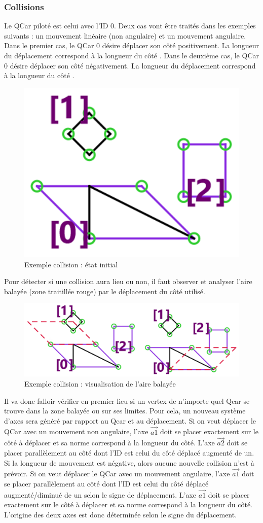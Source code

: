 \documentclass[a4paper, 12pt]{article}
\begin{document}
\subsubsection{Collisions}
Le QCar piloté est celui avec l'ID 0. Deux cas vont être traités dans les exemples suivants : un mouvement linéaire (non angulaire) et un mouvement angulaire. Dans le premier cas, le QCar 0 désire déplacer son côté  positivement. La longueur du déplacement correspond à la longueur du côté . Dans le deuxième cas, le QCar 0 désire déplacer son côté  négativement. La longueur du déplacement correspond à la longueur du côté .
\begin{figure}[h!]
\centering
\includegraphics[width=0.4\linewidth]{includes/images/collisions/1_initialState}
\caption{Exemple collision : état initial}
\label{fig:1initialstate}
\end{figure}
Pour détecter si une collision aura lieu ou non, il faut observer et analyser l'aire balayée (zone traitillée rouge) par le déplacement du côté utilisé.
\begin{figure}[h!]
\centering
\includegraphics[width=0.7\linewidth]{includes/images/collisions/2_sweptArea}
\caption{Exemple collision : visualisation de l'aire balayée}
\label{fig:2sweptarea}
\end{figure}
Il va donc falloir vérifier en premier lieu si un vertex de n'importe quel Qcar se trouve dans la zone balayée ou sur ses limites. Pour cela, un nouveau système d'axes sera généré par rapport au Qcar et au déplacement. Si on veut déplacer le QCar avec un mouvement non angulaire, l'axe $\vec{a1}$ doit se placer exactement sur le côté à déplacer et sa norme correspond à la longueur du côté. L'axe $\vec{a2}$ doit se placer parallèlement au côté dont l'ID est celui du côté déplacé augmenté de un. Si la longueur de mouvement est négative, alors aucune nouvelle collision n'est à prévoir. Si on veut déplacer le QCar avec un mouvement angulaire, l'axe $\vec{a1}$ doit se placer parallèlement au côté dont l'ID est celui du côté déplacé augmenté/diminué de un selon le signe de déplacement. L'axe $\vec{a1}$ doit se placer exactement sur le côté à déplacer et sa norme correspond à la longueur du côté. L'origine des deux axes est donc déterminée selon le signe du déplacement.
\end{document}
